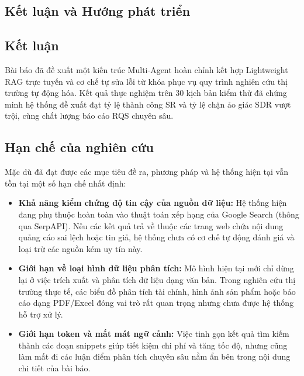 \documentclass[11pt,a4paper]{article}
\begin{document}
\begin{itemize}
\section{Kết luận và Hướng phát triển}

\subsection{Kết luận}
Bài báo đã đề xuất một kiến trúc Multi-Agent hoàn chỉnh kết hợp Lightweight RAG trực tuyến và cơ chế tự sửa lỗi từ khóa phục vụ quy trình nghiên cứu thị trường tự động hóa. Kết quả thực nghiệm trên 30 kịch bản kiểm thử đã chứng minh hệ thống đề xuất đạt tỷ lệ thành công SR và tỷ lệ chặn ảo giác SDR vượt trội, cùng chất lượng báo cáo RQS chuyên sâu.

\subsection{Hạn chế của nghiên cứu}
Mặc dù đã đạt được các mục tiêu đề ra, phương pháp và hệ thống hiện tại vẫn tồn tại một số hạn chế nhất định:
\begin{itemize}
    \item \textbf{Khả năng kiểm chứng độ tin cậy của nguồn dữ liệu:} Hệ thống hiện đang phụ thuộc hoàn toàn vào thuật toán xếp hạng của Google Search (thông qua SerpAPI). Nếu các kết quả trả về thuộc các trang web chứa nội dung quảng cáo sai lệch hoặc tin giả, hệ thống chưa có cơ chế tự động đánh giá và loại trừ các nguồn kém uy tín này.
    \item \textbf{Giới hạn về loại hình dữ liệu phân tích:} Mô hình hiện tại mới chỉ dừng lại ở việc trích xuất và phân tích dữ liệu dạng văn bản. Trong nghiên cứu thị trường thực tế, các biểu đồ phân tích tài chính, hình ảnh sản phẩm hoặc báo cáo dạng PDF/Excel đóng vai trò rất quan trọng nhưng chưa được hệ thống hỗ trợ xử lý.
    \item \textbf{Giới hạn token và mất mát ngữ cảnh:} Việc tinh gọn kết quả tìm kiếm thành các đoạn snippets giúp tiết kiệm chi phí và tăng tốc độ, nhưng cũng làm mất đi các luận điểm phân tích chuyên sâu nằm ẩn bên trong nội dung chi tiết của bài báo.
\end{itemize}


\end{itemize}
\end{document}
